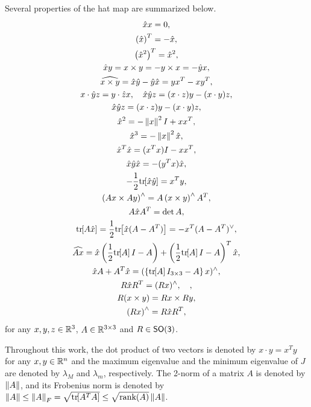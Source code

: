 Several properties of the hat map are summarized below.
\begin{gather}
    \hat{x} x = 0, \\
    \left( \hat x \right) ^T = - \hat x, \\
    \left( \hat{x}^2 \right)^T = \hat x ^2, \\
    \hat x y = x\times y = - y\times x = - \hat y x, \label{eqn:cross_product}\\
    \widehat{x\times y} = \hat x \hat y -\hat y \hat x = yx^T-xy^T,\label{eqn:hatxy}\\
    x\cdot \hat y z = y\cdot \hat z x,\quad \hat x\hat y z = (x\cdot z) y - (x\cdot y ) z\label{eqn:STP},\\
    \hat x\hat y z = (x\cdot z) y - (x\cdot y ) z,\label{eqn:VTP}\\
    \hat{x}^2 = - \left\| x \right\|^2 I + x x^T, \\
    \hat{x}^3 = -\left\| x \right\|^2 \hat x, \\
    \hat x^T \hat x = (x^T x) I - x x^T,\\
    \hat x \hat y \hat x=-(y^Tx)\hat x,\\
    -\frac{1}{2}\mathrm{tr}\negthickspace\left[ \hat x \hat y \right] = x^T y,\\
    \left( A x \times A y \right)^\wedge = A\left( x \times y \right)^\wedge A^T, \\
    A \hat x A^T = \det{A}, \\
    \mathrm{tr}\negthickspace\left[ A\hat x  \right]=\frac{1}{2}\mathrm{tr}\negthickspace\left[ \hat x (A-A^T) \right]=-x^T (A-A^T)^\vee,\label{eqn:hat1}\\
    \widehat{Ax} = \hat x \left( \frac{1}{2}\mathrm{tr}\negthickspace\left[ A \right]I-A \right) + \left( \frac{1}{2}\mathrm{tr}\negthickspace\left[ A \right]I-A \right)^T \hat x,\\
    \hat x  A+A^T\hat x=(\left\{ \mathrm{tr}\negthickspace\left[ A \right]I_{3\times 3}-A \right\}x)^{\wedge}, \label{eqn:xAAx} \\
    R\hat x R^T = (Rx)^\wedge,\quad , \\
    R(x\times y) = Rx\times Ry\label{eqn:RxR} , \\
    \left( R x \right)^\wedge = R \hat x R^T, \\
\end{gather}
for any $x,y,z\in\mathbb{R}^{3}$, $A\in\mathbb{R}^{3\times 3}$ and $R\in\mathsf{SO(3)}$. 

Throughout this work, the dot product of two vectors is denoted by $x\cdot y = x^T y$ for any $x,y\in\mathbb{R}^n$ and the maximum eigenvalue and the minimum eigenvalue of $J$ are denoted by $\lambda_M$ and $\lambda_m$, respectively. 
The 2-norm of a matrix \( A \) is denoted by \( \left\| A \right\| \), and its Frobenius norm is denoted by \( \left\| A \right\| \leq \left\| A \right\|_F = \sqrt{\mathrm{tr}\negthickspace\left[ A^T A \right]} \leq \sqrt{\text{rank}(A)} \left\| A \right\| \).
